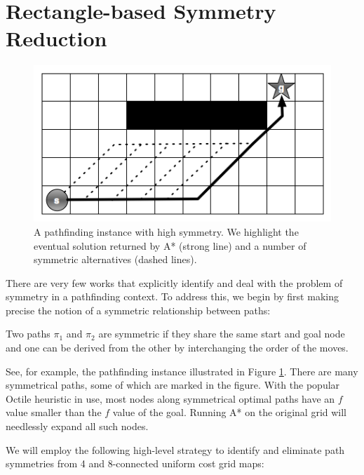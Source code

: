 \section{Rectangle-based Symmetry Reduction}
\label{rooms-based symmetry reduction}

\begin{figure}[]
       \begin{center}
                       \includegraphics[scale=0.36]{diagrams/symmetry_example.png}
       \end{center}
       \caption{A pathfinding instance with high symmetry. We highlight the
eventual solution returned by A* (strong line) and a number of symmetric 
alternatives (dashed lines).}
       \label{fig-symmetry}
		\vspace{-0.5em}
\end{figure}
There are very few works that explicitly identify and deal with the 
problem of symmetry in a pathfinding context. To address this, we begin by first
making precise the notion of a symmetric relationship between paths:
\begin{definition}
Two paths $\pi_{1}$ and $\pi_{2}$ are symmetric if they share the same start and
goal node and one can be derived from the other by interchanging the order of the
moves.
\end{definition}

See, for example, the pathfinding instance illustrated in Figure \ref{fig-symmetry}.
There are many symmetrical paths, some of which are marked in the figure.
With the popular Octile heuristic in use,
most nodes along symmetrical optimal paths have an $f$ 
value smaller than the $f$ value of the goal. 
Running A* on the original grid will needlessly expand all such nodes.

We will employ the following high-level strategy to
identify and eliminate path symmetries from 4 and 8-connected uniform cost grid maps:


